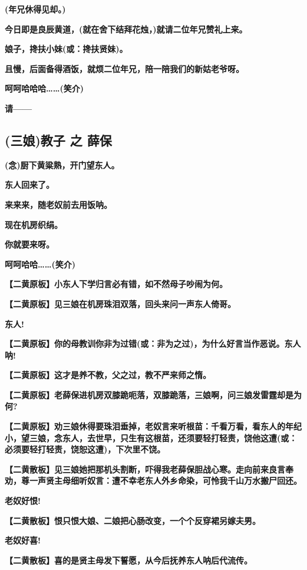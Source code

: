 \textbf{(年兄休得见却。)}

\textbf{今日即是良辰黄道，(就在舍下结拜花烛，)就请二位年兄赞礼上来。}

\textbf{娘子，搀扶小妹(或：搀扶贤妹)。}

\textbf{且慢，后面备得酒饭，就烦二位年兄，陪一陪我们的新姑老爷呀。}

\textbf{呵呵哈哈哈\ldots{}\ldots{}(笑介)}

\textbf{请------}

\hypertarget{ux4e09ux5a18ux6559ux5b50-ux4e4b-ux859bux4fdd}{%
\subsection{(三娘)教子 之
薛保}\label{ux4e09ux5a18ux6559ux5b50-ux4e4b-ux859bux4fdd}}

\textbf{(念)厨下黄粱熟，开门望东人。}

\textbf{东人回来了。}

\textbf{来来来，随老奴前去用饭呐。}

\textbf{现在机房织绢。}

\textbf{你就要来呀。}

\textbf{呵呵哈哈\ldots{}\ldots{}(笑介)}

\textbf{【二黄原板】小东人下学归言必有错，如不然母子吵闹为何。}

\textbf{【二黄原板】见三娘在机房珠泪双落，回头来问一声东人倚哥。}

\textbf{东人!}

\textbf{【二黄原板】你的母教训你非为过错(或：非为之过)，为什么好言当作恶说。东人呐!}

\textbf{【二黄原板】这才是养不教，父之过，教不严来师之惰。}

\textbf{【二黄原板】老薛保进机房双膝跪呃落，双膝跪落，三娘啊，问三娘发雷霆却是为何?}

\textbf{【二黄原板】劝三娘休得要珠泪垂掉，老奴言来听根苗：千看万看，看东人的年纪小，望三娘，念东人，去世早，只生有这根苗，还须要轻打轻责，饶他这遭(或：必须要轻打轻责，饶恕这遭)，下次里不饶。}

\textbf{【二黄散板】见三娘她把那机头割断，吓得我老薛保胆战心寒。走向前来良言奉劝，尊一声贤主母细听奴言：遭不幸老东人外乡命染，可怜我千山万水搬尸回还。}

\textbf{老奴好恨!}

\textbf{【二黄散板】恨只恨大娘、二娘把心肠改变，一个个反穿裙另嫁夫男。}

\textbf{老奴好喜!}

\textbf{【二黄散板】喜的是贤主母发下誓愿，从今后抚养东人呐后代流传。}

